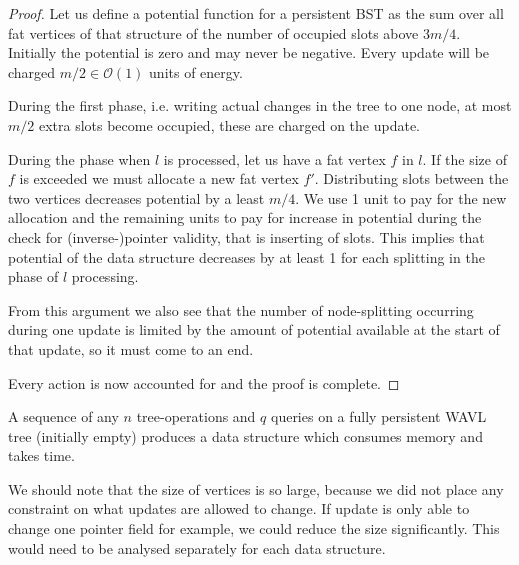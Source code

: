 \begin{proof}
Let us define a potential function for a persistent BST as the sum over all fat vertices of that structure of the number of occupied slots above $3m/4$. Initially the potential is zero and may never be negative. Every update will be charged $m/2 \in \mathcal{O}(1)$ units of energy.

During the first phase, i.e. writing actual changes in the tree to one node, at most $m/2$ extra slots become occupied, these are charged on the update.

During the phase when $l$ is processed, let us have a fat vertex $f$ in $l$. If the size of $f$ is exceeded we must allocate a new fat vertex $f'$. Distributing slots between the two vertices decreases potential by a least $m/4$. We use 1 unit to pay for the new allocation and the remaining units to pay for increase in potential during the check for (inverse-)pointer validity, that is inserting of slots. This implies that potential of the data structure decreases by at least 1 for each splitting in the phase of $l$ processing.

From this argument we also see that the number of node-splitting occurring during one update is limited by the amount of potential available at the start of that update, so it must come to an end.

Every action is now accounted for and the proof is complete.
\end{proof}

\begin{cor}
A sequence of any $n$ tree-operations and $q$ queries on a fully persistent WAVL tree (initially empty) produces a data structure which consumes  memory and takes  time.
\end{cor}

We should note that the size of vertices is so large, because we did not place any constraint on what updates are allowed to change. If update is only able to change one pointer field for example, we could reduce the size significantly. This would need to be analysed separately for each data structure.


